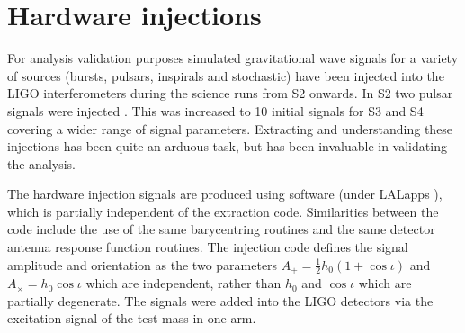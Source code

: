 \section{Hardware injections}
For analysis validation purposes simulated gravitational wave signals for a variety of sources
(bursts, pulsars, inspirals and stochastic) have been injected into the LIGO interferometers during
the science runs from S2 onwards. In S2 two pulsar signals were injected \cite{Abbott:2005}. This
was increased to 10 initial signals for S3 and S4 covering a wider range of signal parameters.
Extracting and understanding these injections has been quite an arduous task, but has been
invaluable in validating the analysis.

The hardware injection signals are produced using software (under LALapps \cite{LALapps}), which is
partially independent of the extraction code. Similarities between the code include the use of the
same barycentring routines and the same detector antenna response function routines. The injection
code defines the signal amplitude and orientation as the two parameters $A_+ = \frac{1}{2}h_0(1 +
\cos{\iota})$ and $A_{\times} = h_0\cos{\iota}$ which are independent, rather than $h_0$ and
$\cos{\iota}$ which are partially degenerate. The signals were added into the LIGO detectors via the
excitation signal of the test mass in one arm.

